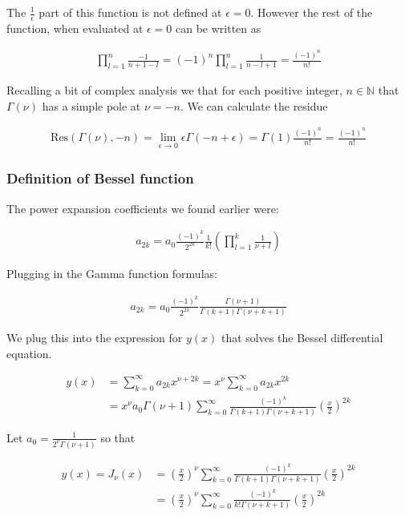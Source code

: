 \documentclass[12pt]{article}
\begin{document}
The $\frac{1}{\epsilon}$ part of this function is not defined at $\epsilon = 0$. However the rest of the function, when evaluated at $\epsilon = 0$ can be written as

\begin{align}
\prod_{l=1}^n \frac{-1}{n+1-l} = (-1)^n \prod_{l=1}^n \frac{1}{n-l+1} = \frac{(-1)^n}{n!}
\end{align}

Recalling a bit of complex analysis we that for each positive integer, $n \in \mathbb{N}$ that $\Gamma(\nu)$ has a simple pole at $\nu = -n$. We can calculate the residue

\begin{align}
\text{Res}(\Gamma(\nu),-n) = \lim_{\epsilon \rightarrow 0} \epsilon \Gamma(-n + \epsilon) = \Gamma(1)\frac{(-1)^n}{n!} = \frac{(-1)^n}{n!}
\end{align}


\subsubsection{Definition of Bessel function}

The power expansion coefficients we found earlier were:

\begin{align}
a_{2k} = a_0 \frac{(-1)^k}{2^{2k}}\frac{1}{k!} \left(\prod_{l=1}^k \frac{1}{\nu+l}\right)
\end{align}

Plugging in the Gamma function formulas:

\begin{align}
a_{2k} = a_0 \frac{(-1)^k}{2^{2k}}\frac{\Gamma(\nu+1)}{\Gamma(k+1)\Gamma(\nu+k+1)}
\end{align}

We plug this into the expression for $y(x)$ that solves the Bessel differential equation.

\begin{align}
y(x) &= \sum_{k=0}^{\infty} a_{2k} x^{\nu+2k} = x^{\nu}\sum_{k=0}^{\infty}a_{2k}x^{2k}\\
&= x^{\nu} a_0 \Gamma(\nu+1)\sum_{k=0}^{\infty} \frac{(-1)^k}{\Gamma(k+1)\Gamma(\nu+k+1)}\left(\frac{x}{2}\right)^{2k}
\end{align}

Let $a_0 = \frac{1}{2^\nu \Gamma(\nu+1)}$ so that

\begin{align}
y(x) = J_{\nu}(x) &= \left(\frac{x}{2}\right)^{\nu} \sum_{k=0}^{\infty}\frac{(-1)^k}{\Gamma(k+1)\Gamma(\nu+k+1)}\left(\frac{x}{2}\right)^{2k}\\
&= \left(\frac{x}{2}\right)^{\nu} \sum_{k=0}^{\infty}\frac{(-1)^k}{k!\Gamma(\nu+k+1)}\left(\frac{x}{2}\right)^{2k}\\
\end{align}
\end{document}
